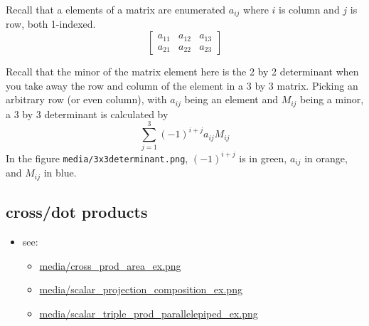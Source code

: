 \documentclass[11pt]{article}
\theoremstyle{definition}
\begin{document}
Recall that a elements of a matrix are enumerated $a_{ij}$ where $i$ is column and $j$ is row, both 1-indexed. 
\[\begin{bmatrix}
  a_{11} & a_{12} & a_{13}\\
  a_{21} & a_{22} & a_{23}
\end{bmatrix}\]

Recall that the minor of the matrix element here is the 2 by 2 determinant when you take away the row and column of the element in a 3 by 3 matrix.  Picking an arbitrary row (or even column), with $a_{ij}$ being an element and $M_{ij}$ being a minor, a 3 by 3 determinant is calculated by 
\[ \sum_{j=1}^{3} (-1)^{i+j} a_{ij} M_{ij} \]
In the figure \texttt{media/3x3determinant.png}, $(-1)^{i+j}$ is in green, $a_{ij}$ in orange, and $M_{ij}$ in blue.

\subsection*{cross/dot products}
\begin{itemize}
  \item see:
  \begin{itemize}
    \item \url{media/cross_prod_area_ex.png}
    \item \url{media/scalar_projection_composition_ex.png}
    \item \url{media/scalar_triple_prod_parallelepiped_ex.png}
  \end{itemize}
\end{itemize}






\end{document}
